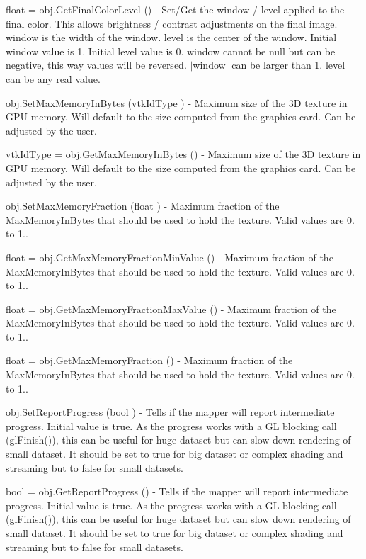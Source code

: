 \begin{DoxyItemize}
\item {\ttfamily float = obj.\-Get\-Final\-Color\-Level ()} -\/ Set/\-Get the window / level applied to the final color. This allows brightness / contrast adjustments on the final image. window is the width of the window. level is the center of the window. Initial window value is 1. Initial level value is 0. window cannot be null but can be negative, this way values will be reversed. $|$window$|$ can be larger than 1. level can be any real value.  
\item {\ttfamily obj.\-Set\-Max\-Memory\-In\-Bytes (vtk\-Id\-Type )} -\/ Maximum size of the 3\-D texture in G\-P\-U memory. Will default to the size computed from the graphics card. Can be adjusted by the user.  
\item {\ttfamily vtk\-Id\-Type = obj.\-Get\-Max\-Memory\-In\-Bytes ()} -\/ Maximum size of the 3\-D texture in G\-P\-U memory. Will default to the size computed from the graphics card. Can be adjusted by the user.  
\item {\ttfamily obj.\-Set\-Max\-Memory\-Fraction (float )} -\/ Maximum fraction of the Max\-Memory\-In\-Bytes that should be used to hold the texture. Valid values are 0. to 1..  
\item {\ttfamily float = obj.\-Get\-Max\-Memory\-Fraction\-Min\-Value ()} -\/ Maximum fraction of the Max\-Memory\-In\-Bytes that should be used to hold the texture. Valid values are 0. to 1..  
\item {\ttfamily float = obj.\-Get\-Max\-Memory\-Fraction\-Max\-Value ()} -\/ Maximum fraction of the Max\-Memory\-In\-Bytes that should be used to hold the texture. Valid values are 0. to 1..  
\item {\ttfamily float = obj.\-Get\-Max\-Memory\-Fraction ()} -\/ Maximum fraction of the Max\-Memory\-In\-Bytes that should be used to hold the texture. Valid values are 0. to 1..  
\item {\ttfamily obj.\-Set\-Report\-Progress (bool )} -\/ Tells if the mapper will report intermediate progress. Initial value is true. As the progress works with a G\-L blocking call (gl\-Finish()), this can be useful for huge dataset but can slow down rendering of small dataset. It should be set to true for big dataset or complex shading and streaming but to false for small datasets.  
\item {\ttfamily bool = obj.\-Get\-Report\-Progress ()} -\/ Tells if the mapper will report intermediate progress. Initial value is true. As the progress works with a G\-L blocking call (gl\-Finish()), this can be useful for huge dataset but can slow down rendering of small dataset. It should be set to true for big dataset or complex shading and streaming but to false for small datasets.  

\end{DoxyItemize}
